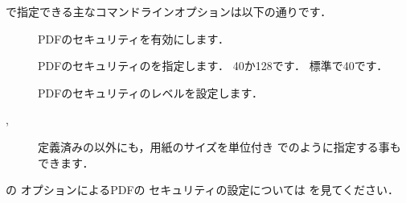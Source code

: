 
\prog{\Dvipdfmx}で指定できる主なコマンドラインオプションは以下の通りです．
\begin{description}
 \item[] 
  PDFのセキュリティを有効にします．
 \item[ ] 
  PDFのセキュリティのを指定します．
  40か128です． 標準で40です．
 \item[] 
  PDFのセキュリティのレベルを設定します．
 \item[ ,] 
 定義済みの以外にも，用紙のサイズを単位付き
 で\qu{\str{20cm,20cm}}のように指定する事もできます．
\end{description}

\prog{\Dvipdfmx}の  オプションによるPDFの
セキュリティの設定については
を見てください．

